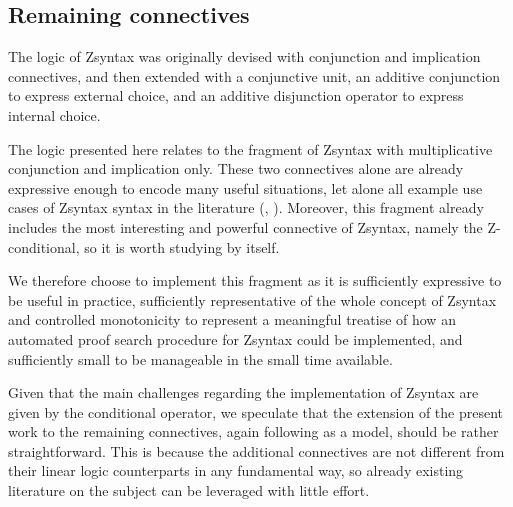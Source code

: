 \subsection{Remaining connectives}

The logic of Zsyntax was originally devised \cite{2010paper} with conjunction
and implication connectives, and then extended \cite{adding-logic} with a
conjunctive unit, an additive conjunction to express external choice, and an
additive disjunction operator to express internal choice.

The logic presented here relates to the fragment of Zsyntax with multiplicative
conjunction and implication only. These two connectives alone are already
expressive enough to encode many useful situations, let alone all example use
cases of Zsyntax syntax in the literature (\cite{2010paper},
\cite{melanoma}). Moreover, this fragment already includes the most interesting
and powerful connective of Zsyntax, namely the Z-conditional, so it is worth
studying by itself.

We therefore choose to implement this fragment as it is sufficiently expressive
to be useful in practice, sufficiently representative of the whole concept of
Zsyntax and controlled monotonicity to represent a meaningful treatise of how an
automated proof search procedure for Zsyntax could be implemented, and
sufficiently small to be manageable in the small time available.

Given that the main challenges regarding the implementation of Zsyntax are given
by the conditional operator, we speculate that the extension of the present work
to the remaining connectives, again following \cite{chaudhuri-thesis} as a
model, should be rather straightforward. This is because the additional
connectives are not different from their linear logic counterparts in any
fundamental way, so already existing literature on the subject can be leveraged
with little effort.

